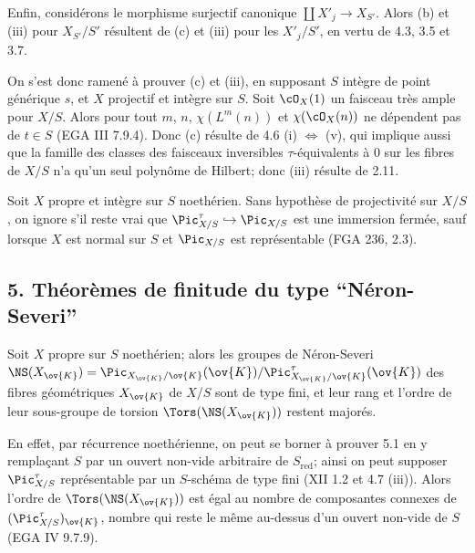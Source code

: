 Enfin, consid\'erons le morphisme surjectif canonique $\coprod X'_j \to X_{S'}$. Alors (b) et (iii) pour $X_{S'}/S'$ r\'esultent de (c) et (iii) pour les $X'_j/S'$, en vertu de 4.3, 3.5 et 3.7.

On s'est donc ramen\'e \`a prouver (c) et (iii), en supposant $S$ int\`egre de point g\'en\'erique $s$, et $X$ projectif et int\`egre sur $S$. Soit $\cO_X(1)$ un faisceau tr\`es ample pour $X/S$. Alors pour tout $m$, $n$, $\chi(L^m(n))$ et $\chi(\cO_X(n))$ ne d\'ependent pas de $t \in S$ (EGA III 7.9.4). Donc (c) r\'esulte de 4.6 (i) $\Leftrightarrow$ (v), qui implique aussi que la famille des classes des faisceaux inversibles $\tau$-\'equivalents \`a $0$ sur les fibres de $X/S$ n'a qu'un seul polyn\^ome de Hilbert; donc (iii) r\'esulte de 2.11.

\begin{remarque}[4.8]
Soit $X$ propre et int\`egre sur $S$ noeth\'erien. Sans hypoth\`ese de projectivit\'e sur $X/S$, on ignore s'il reste vrai que $\Pic^{\tau}_{X/S} \hookrightarrow \Pic_{X/S}$ est une immersion ferm\'ee, sauf lorsque $X$ est normal sur $S$ et $\Pic_{X/S}$ est repr\'esentable (FGA 236, 2.3).
\end{remarque}

\subsection*{5. Th\'eor\`emes de finitude du type ``N\'eron-Severi''}

\begin{theoreme}[5.1]
Soit $X$ propre sur $S$ noeth\'erien; alors les groupes de N\'eron-Severi $\NS(X_{\ov{K}}) = \Pic_{X_{\ov{K}}/\ov{K}}(\ov{K}) / \Pic^{\tau}_{X_{\ov{K}}/\ov{K}}(\ov{K})$ des fibres g\'eom\'etriques $X_{\ov{K}}$ de $X/S$ sont de type fini, et leur rang et l'ordre de leur sous-groupe de torsion $\Tors(\NS(X_{\ov{K}}))$ restent major\'es.
\end{theoreme}

En effet, par r\'ecurrence noeth\'erienne, on peut se borner \`a prouver 5.1 en y rempla\c{c}ant $S$ par un ouvert non-vide arbitraire de $S_{\mathrm{red}}$; ainsi on peut supposer $\Pic^{\tau}_{X/S}$ repr\'esentable par un $S$-sch\'ema de type fini (XII 1.2 et 4.7 (iii)). Alors l'ordre de $\Tors(\NS(X_{\ov{K}}))$ est \'egal au nombre de composantes connexes de $(\Pic^{\tau}_{X/S})_{\ov{K}}$, nombre qui reste le m\^eme au-dessus d'un ouvert non-vide de $S$ (EGA IV 9.7.9).

